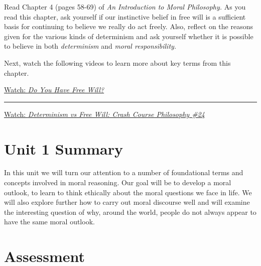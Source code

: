 \documentclass[
]{book}
\begin{document}
\begin{reflect}
Read Chapter 4 (pages 58-69) of \emph{An Introduction to Moral Philosophy.} As you read this chapter, ask yourself if our instinctive belief in free will is a sufficient basis for continuing to believe we really do act freely. Also, reflect on the reasons given for the various kinds of determinism and ask yourself whether it is possible to believe in both \emph{determinism} and \emph{moral responsibility.}

Next, watch the following videos to learn more about key terms from this chapter.

\href{https://www.youtube.com/watch?v=EMdAnU3vYzA\&t=2s}{Watch: \emph{Do You Have Free Will?}}

\begin{center}\rule{0.5\linewidth}{0.5pt}\end{center}

\href{https://www.youtube.com/watch?v=vCGtkDzELAI}{Watch: \emph{Determinism vs Free Will: Crash Course Philosophy \#24}}
\end{reflect}

\hypertarget{unit-1-summary}{%
\section*{Unit 1 Summary}\label{unit-1-summary}}

In this unit we will turn our attention to a number of foundational terms and concepts involved in moral reasoning. Our goal will be to develop a moral outlook, to learn to think ethically about the moral questions we face in life. We will also explore further how to carry out moral discourse well and will examine the interesting question of why, around the world, people do not always appear to have the same moral outlook.

\hypertarget{assessment-1}{%
\section*{Assessment}\label{assessment-1}}
\end{document}

